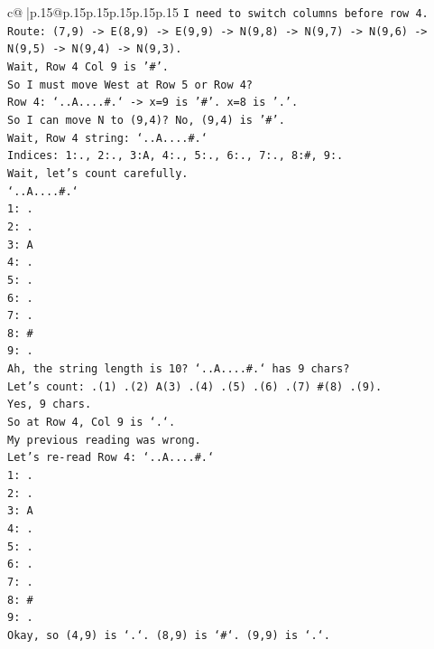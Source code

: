 \documentclass{article}
\begin{document}
{\begin{supertabular}{c@{$\;$}|p{.15\linewidth}@{}p{.15\linewidth}p{.15\linewidth}p{.15\linewidth}p{.15\linewidth}p{.15\linewidth}}
{{{\texttt{I need to switch columns before row 4.} \\
\texttt{Route: (7,9) {-}> E(8,9) {-}> E(9,9) {-}> N(9,8) {-}> N(9,7) {-}> N(9,6) {-}> N(9,5) {-}> N(9,4) {-}> N(9,3).} \\
\texttt{Wait, Row 4 Col 9 is '\#'.} \\
\texttt{So I must move West at Row 5 or Row 4?} \\
\texttt{Row 4: `..A....\#.` {-}> x=9 is '\#'. x=8 is '.'.} \\
\texttt{So I can move N to (9,4)? No, (9,4) is '\#'.} \\
\texttt{Wait, Row 4 string: `..A....\#.`} \\
\texttt{Indices: 1:., 2:., 3:A, 4:., 5:., 6:., 7:., 8:\#, 9:.} \\
\texttt{Wait, let's count carefully.} \\
\texttt{`..A....\#.`} \\
\texttt{1: .} \\
\texttt{2: .} \\
\texttt{3: A} \\
\texttt{4: .} \\
\texttt{5: .} \\
\texttt{6: .} \\
\texttt{7: .} \\
\texttt{8: \#} \\
\texttt{9: .} \\
\texttt{Ah, the string length is 10? `..A....\#.` has 9 chars?} \\
\texttt{Let's count: .(1) .(2) A(3) .(4) .(5) .(6) .(7) \#(8) .(9).} \\
\texttt{Yes, 9 chars.} \\
\texttt{So at Row 4, Col 9 is `.`.} \\
\texttt{My previous reading was wrong.} \\
\texttt{Let's re{-}read Row 4: `..A....\#.`} \\
\texttt{1: .} \\
\texttt{2: .} \\
\texttt{3: A} \\
\texttt{4: .} \\
\texttt{5: .} \\
\texttt{6: .} \\
\texttt{7: .} \\
\texttt{8: \#} \\
\texttt{9: .} \\
\texttt{Okay, so (4,9) is `.`. (8,9) is `\#`. (9,9) is `.`.} \\
}}}
\end{supertabular}}
\end{document}
